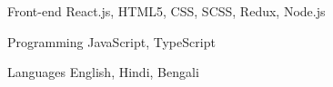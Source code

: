

\begin{cvskills}


  \cvskill
    {Front-end} %
    {React.js, HTML5, CSS, SCSS, Redux, Node.js} %


  \cvskill
    {Programming} %
    {JavaScript, TypeScript} %


  \cvskill
    {Languages} %
    {English, Hindi, Bengali} %

\end{cvskills}
